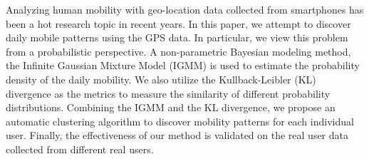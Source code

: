 
Analyzing human mobility with geo-location data collected from smartphones has been a hot research topic in recent years. In this paper, we attempt to discover daily mobile patterns using the GPS data. In particular, we view this problem from a probabilistic perspective. A non-parametric Bayesian modeling method, the Infinite Gaussian Mixture Model (IGMM) is used to estimate the probability density of the daily mobility. We also utilize the Kullback-Leibler (KL) divergence as the metrics to measure the similarity of different probability distributions. Combining the IGMM and the KL divergence, we propose an automatic clustering algorithm to discover mobility patterns for each individual user. Finally, the effectiveness of our method is validated on the real user data collected from different real users. 



